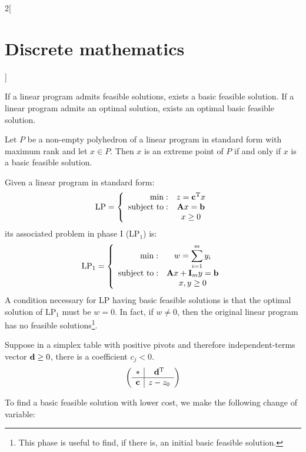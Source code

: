 \documentclass[../../../main.tex]{subfiles}
\begin{document}
\begin{multicols}{2}[\section{Discrete mathematics}]
\begin{prop}
    If a linear program admits feasible solutions, exists a basic feasible solution. If a linear program admits an optimal solution, exists an optimal basic feasible solution.
  \end{prop}
  \begin{theorem}
    Let $P$ be a non-empty polyhedron of a linear program in standard form with maximum rank and let $x\in P$. Then $x$ is an extreme point of $P$ if and only if $x$ is a basic feasible solution.
  \end{theorem}
  \begin{definition}
    Given a linear program in standard form:
    $$\text{LP}=\left\{
      \begin{array}{rc}
        \min:              & z=\vb{c}^{\mathrm{T}}x                       \\
        \text{subject to}: & \boldsymbol{\mathrm{A}}x=\boldsymbol{\mathrm{b}} \\
                           & x\geq 0
      \end{array}\right.$$ its associated problem in phase I ($\text{LP}_1$) is: $$\text{LP}_1=\left\{\begin{array}{rc}
        \min:              & \displaystyle w=\sum_{i=1}^my_i                              \\
        \text{subject to}: & \boldsymbol{\mathrm{A}}x+\boldsymbol{\mathrm{I}}_my=\boldsymbol{\mathrm{b}} \\
                           & x,y\geq 0
      \end{array}\right.$$
    A condition necessary for LP having basic feasible solutions is that the optimal solution of $\text{LP}_1$ must be $w=0$. In fact, if $w\ne 0$, then the original linear program has no feasible solutions\footnote{This phase is useful to find, if there is, an initial basic feasible solution.}.
  \end{definition}
  \begin{prop}
    Suppose in a simplex table with positive pivots and therefore independent-terms vector $\boldsymbol{\mathrm{d}}\geq 0$, there is a coefficient $c_j<0$. $$\left(\begin{array}{c|c}
          *                  & \vb{d}^{\mathrm{T}} \\
          \hline
          \boldsymbol{\mathrm{c}} & z-z_0
        \end{array}\right)$$
  \end{prop}
  To find a basic feasible solution with lower cost, we make the following change of variable:

\end{multicols}
\end{document}
